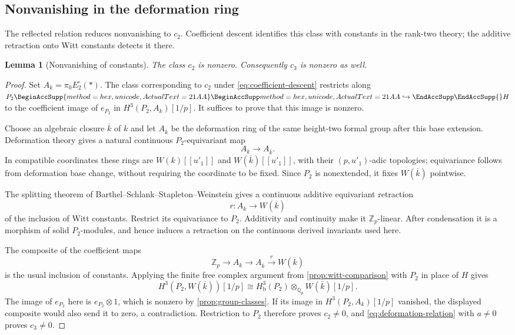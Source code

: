 \documentclass[11pt]{article}
\numberwithin{equation}{section}
\newtheorem{lemma}[theorem]{Lemma}
\theoremstyle{definition}
\theoremstyle{remark}
\newcommand{\Q}{\mathbb Q}
\newcommand{\Z}{\mathbb Z}
\let\UnicodeOriginalHookrightarrow\hookrightarrow
\DeclareRobustCommand{\hookrightarrow}{
  \BeginAccSupp{method=hex,unicode,ActualText=21AA}
  \UnicodeOriginalHookrightarrow\EndAccSupp{}}
\begin{document}
\subsection{Nonvanishing in the deformation ring}

The reflected relation reduces nonvanishing to $c_2$. Coefficient
descent identifies this class with constants in the rank-two theory;
the additive retraction onto Witt constants detects it there.

\begin{lemma}[Nonvanishing of constants]\label{lem:constant-nonvanishing}
The class $c_2$ is nonzero.  Consequently $c_3$ is nonzero as well.
\end{lemma}

\begin{proof}
Set $A_k=\pi_0E_2^{\square}(*)$.  The class corresponding to $c_2$
under \eqref{eq:coefficient-descent} restricts along $P_2\hookrightarrow H$
to the coefficient image of $e_{P_2}$ in $H^3(P_2,A_k)[1/p]$.
It suffices to prove that this image is nonzero.

Choose an algebraic closure $\overline k$ of $k$ and let
$A_{\overline k}$ be the deformation ring of the same height-two
formal group after this base extension.  Deformation theory gives
a natural continuous $P_2$-equivariant map
\[
 A_k\longrightarrow A_{\overline k}.
\]
In compatible coordinates these rings are $W(k)[[u'_1]]$ and
$W(\overline k)[[u'_1]]$, with their $(p,u'_1)$-adic topologies;
equivariance follows from deformation base change, without requiring
the coordinate to be fixed.  Since $P_2$ is nonextended, it fixes
$W(\overline k)$ pointwise.

The splitting theorem of Barthel--Schlank--Stapleton--Weinstein
\cite[Proposition~2.5.1 and Corollary~2.5.9]{BSSW2025} gives a
continuous additive equivariant retraction
\[
 r:A_{\overline k}\longrightarrow W(\overline k)
\]
of the inclusion of Witt constants. Restrict its equivariance to $P_2$.
Additivity and continuity make it $\Z_p$-linear. After condensation
it is a morphism of solid $P_2$-modules, and hence
induces a retraction on the continuous derived invariants used here.

The composite of the coefficient maps
\[
 \Z_p\longrightarrow A_k\longrightarrow A_{\overline k}
       \xrightarrow{r}W(\overline k)
\]
is the usual inclusion of constants.  Applying the finite free
complex argument from \cref{prop:witt-comparison} with $P_2$ in
place of $H$ gives
\[
 H^3(P_2,W(\overline k))[1/p]
   \cong H^3_{\mathrm b}(P_2)
          \otimes_{\Q_p}W(\overline k)[1/p].
\]
The image of $e_{P_2}$ here is $e_{P_2}\otimes1$, which is nonzero
by \cref{prop:group-classes}.  If its image in
$H^3(P_2,A_k)[1/p]$ vanished, the displayed composite would also
send it to zero, a contradiction.  Restriction to $P_2$ therefore
proves $c_2\ne0$, and \eqref{eq:deformation-relation} with $a\ne0$
proves $c_3\ne0$.
\end{proof}
\end{document}
